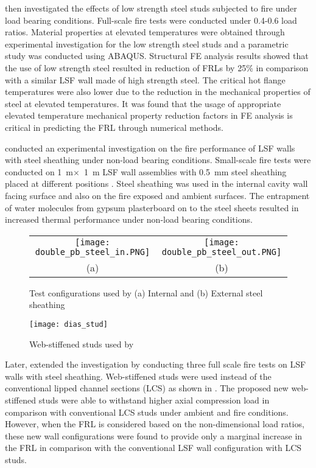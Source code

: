 \citet{Ariyanayagam2018c} then investigated the effects of low strength steel studs subjected to fire under load bearing conditions. Full-scale fire tests were conducted under 0.4-0.6 load ratios. Material properties at elevated temperatures were obtained through experimental investigation for the low strength steel studs and a parametric study was conducted using ABAQUS. Structural FE analysis results showed that the use of low strength steel resulted in reduction of FRLs by 25\% in comparison with a similar LSF wall made of high strength steel. The critical hot flange temperatures were also lower due to the reduction in the mechanical properties of steel at elevated temperatures. It was found that the usage of appropriate elevated temperature mechanical property reduction factors in FE analysis is critical in predicting the FRL through numerical methods. 

\citet{Dias2018a} conducted an experimental investigation on the fire performance of LSF walls with steel sheathing under non-load bearing conditions. Small-scale fire tests were conducted on 1~m$\times$~1~m LSF wall assemblies with 0.5~mm steel sheathing placed at different positions . Steel sheathing was used in the internal cavity wall facing surface and also on the fire exposed and ambient surfaces. The entrapment of water molecules from gypsum plasterboard on to the steel sheets resulted in increased thermal performance under non-load bearing conditions.   
\begin{figure}
	\centering
		\begin{tabular}{cc}
			\texttt{[image: double\_pb\_steel\_in.PNG]} &	
			\texttt{[image: double\_pb\_steel\_out.PNG]} \\
			(a) & (b) \\
		\end{tabular}
	\caption{Test configurations used by \citet{Dias2019c} (a) Internal and (b) External steel sheathing}
	\label{fig:dias_configuration}
\end{figure}
\begin{figure}[!htbp]
	\centering
		\texttt{[image: dias\_stud]}		
		\caption{Web-stiffened studs used by \citet{Dias2019c}}
		\label{fig:dias_stud}
\end{figure}

Later, \citet{Dias2019c} extended the investigation by conducting three full scale fire tests on LSF walls with steel sheathing. Web-stiffened studs were used instead of the conventional lipped channel sections (LCS) as shown in . The proposed new web-stiffened studs were able to withstand higher axial compression load in comparison with conventional LCS studs under ambient and fire conditions. However, when the FRL is considered based on the non-dimensional load ratios, these new wall configurations were found to provide only a marginal increase in the FRL in comparison with the conventional LSF wall configuration with LCS studs. 

